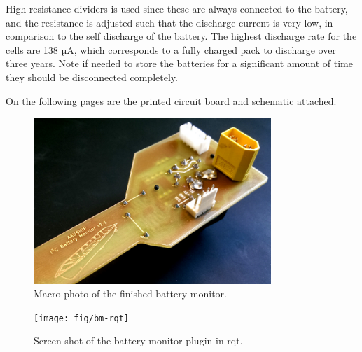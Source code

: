 High resistance dividers is used since these are always connected to
the battery, and the resistance is adjusted such that the discharge
current is very low, in comparison to the self discharge of the
battery. The highest discharge rate for the cells are 138 µA, which
corresponds to a fully charged pack to discharge over three years.
Note if needed to store the batteries for a significant amount of
time they should be disconnected completely.

On the following pages are the printed circuit board and schematic attached.

\begin{figure}[H]
	\centering
	\includegraphics[width=0.8\textwidth]{fig/bm-macro}
	\caption{Macro photo of the finished battery monitor.}
	\label{fig:bm-macro}
\end{figure}

\begin{figure}[H]
	\centering
	\texttt{[image: fig/bm-rqt]}
	\caption{Screen shot of the battery monitor plugin in rqt.}
	\label{fig:bm-rqt}
\end{figure}



